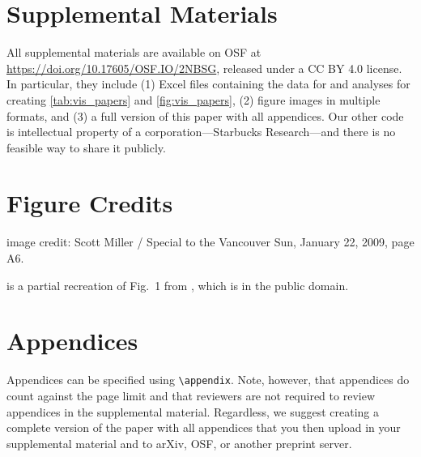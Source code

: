 \documentclass[journal]{vgtc}                %
\begin{document}
\lipsum[1-7]%



\section*{Supplemental Materials}
\label{sec:supplemental_materials}

All supplemental materials are available on OSF at \url{https://doi.org/10.17605/OSF.IO/2NBSG}, released under a CC BY 4.0 license.
In particular, they include (1) Excel files containing the data for and analyses for creating \cref{tab:vis_papers} and \cref{fig:vis_papers}, (2) figure images in multiple formats, and (3) a full version of this paper with all appendices.
Our other code is intellectual property of a corporation---Starbucks Research---and there is no feasible way to share it publicly.


\section*{Figure Credits}

 image credit: Scott Miller / Special to the Vancouver Sun, January 22, 2009, page A6.

 is a partial recreation of Fig.\ 1 from \cite{Isenberg:2017:VMC}, which is in the public domain.





%
%
%




\appendix

\section{Appendices}

Appendices can be specified using \verb|\appendix|.
Note, however, that appendices do count against the page limit and that reviewers are not required to review appendices in the supplemental material.
Regardless, we suggest creating a complete version of the paper with all appendices that you then upload in your supplemental material and to arXiv, OSF, or another preprint server.
\end{document}

